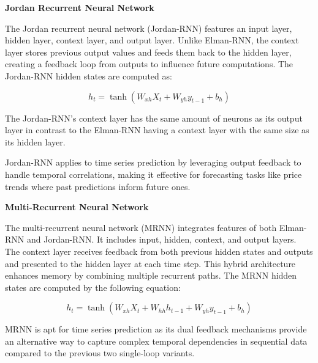 \documentclass[conference, 10pt]{IEEEtran}
\begin{document}


\textbf{Jordan Recurrent Neural Network }

The Jordan recurrent neural network (Jordan-RNN) features an input layer, hidden layer, context layer, and output layer. Unlike
Elman-RNN, the context layer stores previous output values and feeds them back to the hidden layer, creating a feedback
loop from outputs to influence future computations. The Jordan-RNN hidden states are computed as:

$$h_t = \tanh(W_{xh}X_t + W_{yh}y_{t-1} + b_h)$$

The Jordan-RNN's context layer has the same amount of neurons as its output layer in contrast to the Elman-RNN having a
context layer with the same size as its hidden layer.

Jordan-RNN applies to time series prediction by leveraging output feedback to handle temporal correlations, making it effective
for forecasting tasks like price trends where past predictions inform future ones.


\textbf{Multi-Recurrent Neural Network }

The multi-recurrent neural network (MRNN) integrates features of both Elman-RNN and Jordan-RNN. It includes input,
hidden, context, and output layers. The context layer receives feedback from both previous hidden states and
outputs and presented to the hidden layer at each time step. This hybrid architecture enhances memory by combining multiple
recurrent paths. The MRNN hidden states are computed by the following equation: 

$$h_t = \tanh(W_{xh}X_t + W_{hh}h_{t-1} + W_{yh}y_{t-1} + b_h)$$

MRNN is apt for time series prediction as its dual feedback mechanisms provide an alternative way to capture complex
temporal dependencies in sequential data compared to the previous two single-loop variants.
\end{document}

